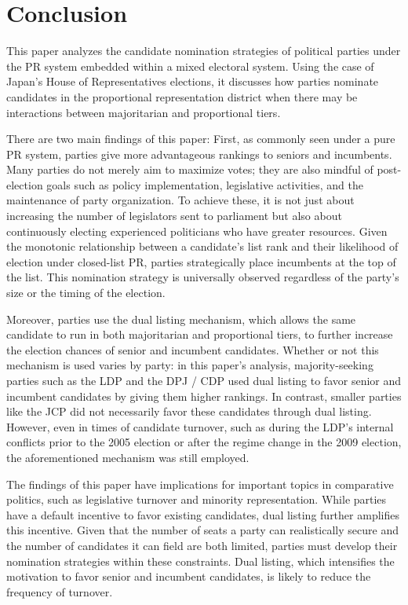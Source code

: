\documentclass[a4paper, 11pt]{article}
\begin{document}
\section{Conclusion}

This paper analyzes the candidate nomination strategies of political parties under the PR system embedded within a mixed electoral system. Using the case of Japan’s House of Representatives elections, it discusses how parties nominate candidates in the proportional representation district when there may be interactions between majoritarian and proportional tiers.

There are two main findings of this paper: First, as commonly seen under a pure PR system, parties give more advantageous rankings to seniors and incumbents. Many parties do not merely aim to maximize votes; they are also mindful of post-election goals such as policy implementation, legislative activities, and the maintenance of party organization. To achieve these, it is not just about increasing the number of legislators sent to parliament but also about continuously electing experienced politicians who have greater resources. Given the monotonic relationship between a candidate’s list rank and their likelihood of election under closed-list PR, parties strategically place incumbents at the top of the list. This nomination strategy is universally observed regardless of the party’s size or the timing of the election.

Moreover, parties use the dual listing mechanism, which allows the same candidate to run in both majoritarian and proportional tiers, to further increase the election chances of senior and incumbent candidates. Whether or not this mechanism is used varies by party: in this paper's analysis, majority-seeking parties such as the LDP and the DPJ / CDP used dual listing to favor senior and incumbent candidates by giving them higher rankings. In contrast, smaller parties like the JCP did not necessarily favor these candidates through dual listing. However, even in times of candidate turnover, such as during the LDP's internal conflicts prior to the 2005 election or after the regime change in the 2009 election, the aforementioned mechanism was still employed.

The findings of this paper have implications for important topics in comparative politics, such as legislative turnover and minority representation. While parties have a default incentive to favor existing candidates, dual listing further amplifies this incentive. Given that the number of seats a party can realistically secure and the number of candidates it can field are both limited, parties must develop their nomination strategies within these constraints. Dual listing, which intensifies the motivation to favor senior and incumbent candidates, is likely to reduce the frequency of turnover.
\end{document}
